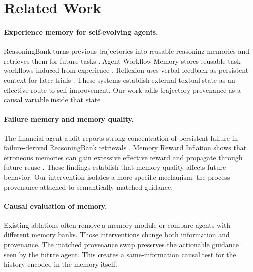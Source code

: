 \section{Related Work}
\paragraph{Experience memory for self-evolving agents.} ReasoningBank turns previous trajectories into reusable reasoning memories and retrieves them for future tasks \citep{ouyang2026reasoningbank}. Agent Workflow Memory stores reusable task workflows induced from experience \citep{wang2024awm}. Reflexion uses verbal feedback as persistent context for later trials \citep{shinn2023reflexion}. These systems establish external textual state as an effective route to self-improvement. Our work adds trajectory provenance as a causal variable inside that state.

\paragraph{Failure memory and memory quality.} The financial-agent audit reports strong concentration of persistent failure in failure-derived ReasoningBank retrievals \citep{li2026audit}. Memory Reward Inflation shows that erroneous memories can gain excessive effective reward and propagate through future reuse \citep{asadolahi2026inflation}. These findings establish that memory quality affects future behavior. Our intervention isolates a more specific mechanism: the process provenance attached to semantically matched guidance.

\paragraph{Causal evaluation of memory.} Existing ablations often remove a memory module or compare agents with different memory banks. Those interventions change both information and provenance. The matched provenance swap preserves the actionable guidance seen by the future agent. This creates a same-information causal test for the history encoded in the memory itself.
